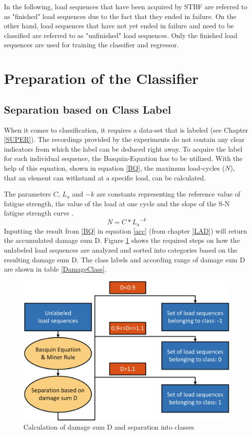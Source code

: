 In the following, load sequences that have been acquired by STBF are referred to as "finished" load sequences due to the fact that they ended in failure. On the other hand, load sequences that have not yet ended in failure and need to be classified are referred to as "unfinished" load sequences. Only the finished load sequences are used for training the classifier and regressor.
\newpage

\section{Preparation of the Classifier}
\subsection{Separation based on Class Label}\label{SBOC}
When it comes to classification, it requires a data-set that is labeled (see Chapter \ref{SUPER}). The recordings provided by the experiments do not contain any clear indicators from which the label can be deduced right away. To acquire the label for each individual sequence, the Basquin-Equation \cite{DIN50100} has to be utilized. With the help of this equation, shown in equation \ref{BQ}, the maximum load-cycles (\(N\)), that an element can withstand at a specific load, can be calculated.

The parameters \(C\), \(L_a\) and \(-k\) are constants representing the reference value of fatigue strength, the value of the load at one cycle and the slope of the S-N fatigue strength curve \cite{SOLID}. 
\begin{equation}\label{BQ}
	N = {C}*{L_a}^{-k}
\end{equation}
Inputting the result from \ref{BQ} in equation \ref{acc} (from chapter \ref{LAD}) will return the accumulated damage sum D. Figure \ref{fig:SBC} shows the required steps on how the unlabeled load sequences are analyzed and sorted into categories based on the resulting damage sum D. The class labels and according range of damage sum D are shown in table \ref{DamageClass}.

\begin{figure}[H]
	\centering
	\includegraphics[width=0.8\linewidth]{IMGs/SBC.png}
	\caption{Calculation of damage sum D and separation into classes}
	\label{fig:SBC}
\end{figure}

